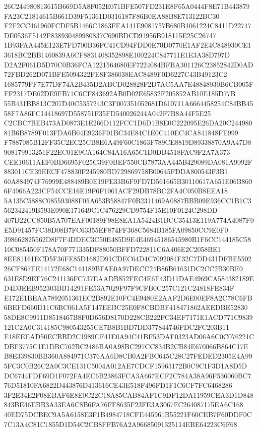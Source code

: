 \documentclass[UTF8,fontset=fandol,zihao=-4,a4paper]{ctexart}
\begin{document}
{{26C244980813615B669D5A8F052E071BFE507FD231E8F65A0444F8E71B443879FA23C21814615B661D39F51361D0316187F86B0EA88B8E713122BC30
F2F2CC461960FCDF5B1466C1863FEA141E9081757B680B1061224C8411D22747DE0536F5142F838930489980837C690BDCD91956B918115E25C26747
1B93FAA445E123E7FD700B36FC41CD94FDD0E70D0770E1AF2E4C848930CE13618BC2BB1460839A6CF8831408352898E100224C847711E1E3A38D797D
D2A2F061D5D70C0B36FCA1221564680EF7224084BFBA301126C23852842D0AD72FBD262D071BFE5094322FE8F386038EAC8489F0D6227C43B49123C2
1685779FF7E77DF74A2B435D2ABCD028828F2D7AC5AA7E48848930B6CB005FFF2317DE62DE9FB71C6CF843692AB0D02E65832F205852AB10E185D77B
55B431BB813C207D40C5357243C3F007351052681D610711A6664458254C84BB4558F7A86FC14418697D558751F35FD540026244A042F7B8A44F5E25
C2CBC7BEB473AD0873E1E266D112FCC1D6D1B8E0C222095E26DA20C24498081B6B8789F013FDA6B04E9236F01BC34E84C1E0C410EC4CA841848FE999
F7887085B12FF35C2EC25CB8E6A49F60C1863F789CE8819D89338870A9A47D8908179913251F22EC01E9CA164C84A16A65C1D0DB4518FAC9F2A7A373
CEE10611AEF0BD6695F025C39F0BEF550CB7873AA445B429089DA081A9092F883011CE39EECF478830F245980BD729869758B00645FDDA800543F3B1
60A884974F76999E488489B0E19FE33B6F9FD7D561665B30110617A651E06B8606F4966A223CF54CCE16E19F6F1061ACF29DB78BC2FA4C050B8EEA18
5A135C5888C085593088F05A653B58847F0B2311469A0887BBB09E936CC1B1C3562342419B593E090E171649C1C476229CD9754F15E10F0124C298DD
407D22CC850B5A707EAF00189F98E8EA1A5424B1BCC35413E119A774A4087F0E5D91457FC38D08B7FC63355EF874FF368C5684B185FA09850CC9E0F0
398662825562D8F7F4DDEC3C50E485D9E4E46945186545980B1F6CC144185C5810C085450F178A70F771335DF88050BFFD722811C6A406E2C2058BE1
8EE81161ECD5F36FE85D1682D91CDEC64D4C7092084F32C7DD431DFBE550226CF867FE14172E68C144189BFAE0A97DECC24B86B61631DC2CC2B30BE0
631E8D9EF76C241136FC737EAADB852FEC4E6F43D11DAE4969CA584382189ED4D3EEB952303BB14291FE53A7029F97F9CFB0C257C121C24818FE834F
E172E1BEAA7892051361EC2B892E10FC4E9480E2AAF2D6E00EF8A2C78C6FB6BEFD660D11C6BC061A5F147EEBC25E0F8CBDBF418471862AEEDBE52830
58DE8C9911D8518467B8F0D656D8170D228CB222FC34EF7171E1ACD771C9839121C2A0C314185C980543255CE7B8B1BD7DD377844746FDC2FC203B11
E18EEEAD50ECBBD2C1989CF41E0A94C41BF53DAF0323AD06A6C0C076221CDBF3775C1E1DBC762BC2486BA0A98BC297CC834B2CB84E670066B864C17E
B8E339830BB360A884971C376AA6D8CB0A2FBC645C28C27FEDED2305E4A995FC3C0B26C2A0C3CE131C5004A012AE7CDCF15963172B0C9C1F3D1A8D5D
DC6744FDF69D1F072FA4EC6B23863FCA3A667ECF2C784A38A96F536060BC776D51810FA6822D443876D413616CE43E518F496FD1F1C6CF7FC6468286
3F2E34E2F08EBAF6E8E0C22C18A85CAB84AF1C9DF12DA11959CEA3D1D848843BE46EBB3A33EA6C8B6FA76FF8635F23FE3A3067FC264087175EA6C168
40ED75DCBEC9A5A6158E3F1B4984718CFE445961B55221F60CEB7F60DDF0C7C13A4C81C1855D1D54C2CB8FFB76A2A96685091325114EBE64223C6F68
}}
\end{document}
